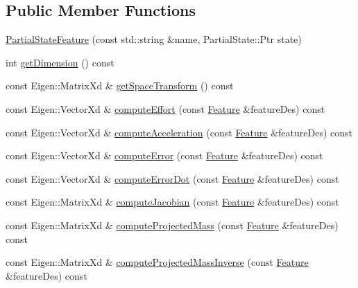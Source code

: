 \subsection*{Public Member Functions}
\begin{DoxyCompactItemize}
\item 
\hyperlink{classocra_1_1PartialStateFeature_a07a8b02519ae7a77580f8e2deefc86dd}{Partial\+State\+Feature} (const std\+::string \&name, Partial\+State\+::\+Ptr state)
\item 
int \hyperlink{classocra_1_1PartialStateFeature_a15b65bc093b9578fc60c04490e0dd73d}{get\+Dimension} () const
\item 
const Eigen\+::\+Matrix\+Xd \& \hyperlink{classocra_1_1PartialStateFeature_ac22525347f868a352d4fa2cab69a12d6}{get\+Space\+Transform} () const
\item 
const Eigen\+::\+Vector\+Xd \& \hyperlink{classocra_1_1PartialStateFeature_a96de4c58baceb9430a1845c4db6ecdfc}{compute\+Effort} (const \hyperlink{classocra_1_1Feature}{Feature} \&feature\+Des) const
\item 
const Eigen\+::\+Vector\+Xd \& \hyperlink{classocra_1_1PartialStateFeature_a42af1ac22fc5d9832e134f507a77bfad}{compute\+Acceleration} (const \hyperlink{classocra_1_1Feature}{Feature} \&feature\+Des) const
\item 
const Eigen\+::\+Vector\+Xd \& \hyperlink{classocra_1_1PartialStateFeature_af109d0d3c367db31f45f46fcc7c669c8}{compute\+Error} (const \hyperlink{classocra_1_1Feature}{Feature} \&feature\+Des) const
\item 
const Eigen\+::\+Vector\+Xd \& \hyperlink{classocra_1_1PartialStateFeature_a5abaab0eb99ac60f0150c4137960ee14}{compute\+Error\+Dot} (const \hyperlink{classocra_1_1Feature}{Feature} \&feature\+Des) const
\item 
const Eigen\+::\+Matrix\+Xd \& \hyperlink{classocra_1_1PartialStateFeature_a8b70dbff8a1a06f16621d34b3e8bc5cf}{compute\+Jacobian} (const \hyperlink{classocra_1_1Feature}{Feature} \&feature\+Des) const
\item 
const Eigen\+::\+Matrix\+Xd \& \hyperlink{classocra_1_1PartialStateFeature_a9554341f9015361e4c7dc544f6415470}{compute\+Projected\+Mass} (const \hyperlink{classocra_1_1Feature}{Feature} \&feature\+Des) const
\item 
const Eigen\+::\+Matrix\+Xd \& \hyperlink{classocra_1_1PartialStateFeature_acebec8dd4cadc55641a9286fb3685674}{compute\+Projected\+Mass\+Inverse} (const \hyperlink{classocra_1_1Feature}{Feature} \&feature\+Des) const
\item 

\end{DoxyCompactItemize}
